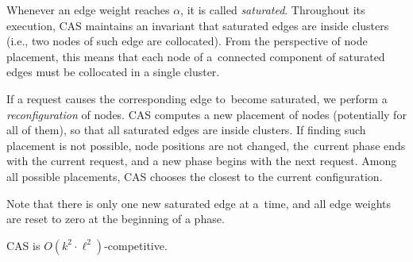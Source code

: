 \documentclass[a4paper,USenglish]{lipics-v2019}
\newcommand{\DET}{\textsf{CAS}\xspace}
\begin{document}
Whenever an edge weight reaches $\alpha$, it is called \emph{saturated}.
Throughout its execution, \DET maintains an invariant that saturated edges are inside clusters (i.e., two nodes of such edge are collocated). 
From the perspective of node placement, this means that each node of a~connected component of saturated edges must be collocated in a single cluster.

If a
request causes the corresponding edge to~become saturated,
we perform a \emph{reconfiguration} of nodes.
\DET computes a new placement of nodes (potentially for all of them), so that all
saturated edges are inside clusters.
If finding such placement
is not possible, node positions are not changed, the~current phase ends
with the current request, and a new phase begins with the next request.
Among all possible placements, \DET chooses the closest to the current
configuration. 

Note that there is only one new saturated edge at a~time, and all edge weights are reset to zero at the beginning of a phase.


\begin{theorem}
\DET is $O(k^2 \cdot \ell^2)$-competitive.
\label{th:detsqare}
\end{theorem}
\end{document}
